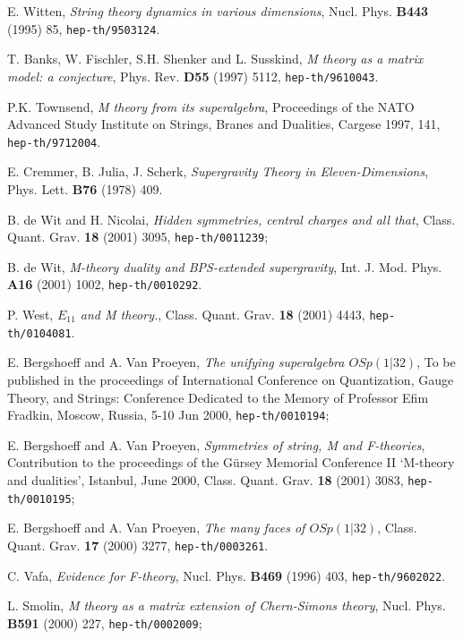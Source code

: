 \documentclass[a4paper,11pt]{article}
\begin{document}
\begin{thebibliography}{99}

E. Witten, {\it String theory dynamics in various dimensions},
Nucl. Phys. {\bf B443} (1995) 85, {\tt hep-th/9503124}.

T. Banks, W. Fischler, S.H. Shenker and L. Susskind,
{\it M theory as a matrix model: a conjecture},
Phys. Rev. {\bf D55} (1997) 5112, {\tt hep-th/9610043}.

P.K. Townsend, {\it M theory from its superalgebra},
Proceedings of the NATO Advanced Study Institute on Strings, 
Branes and Dualities, Cargese 1997, 141, {\tt hep-th/9712004}.

E. Cremmer, B. Julia, J. Scherk, {\it Supergravity Theory in Eleven-Dimensions},
Phys. Lett. {\bf B76} (1978) 409.

B. de Wit and H. Nicolai, {\it Hidden symmetries, central charges and all that}, 
Class. Quant. Grav. {\bf 18} (2001) 3095, {\tt hep-th/0011239};

B. de Wit, {\it M-theory duality and BPS-extended supergravity},
Int. J. Mod. Phys. {\bf A16} (2001) 1002, {\tt hep-th/0010292}.

P. West, {\it $E_{11}$ and M theory.}, 
Class. Quant. Grav. {\bf 18} (2001) 4443, {\tt hep-th/0104081}.

E. Bergshoeff and A. Van Proeyen, {\it The unifying superalgebra $OSp(1|32)$},
To be published in the proceedings of International Conference on Quantization, 
Gauge Theory, and Strings: Conference Dedicated to the Memory of Professor Efim Fradkin, 
Moscow, Russia, 5-10 Jun 2000, {\tt hep-th/0010194};

E. Bergshoeff and A. Van Proeyen, {\it Symmetries of string, M and F-theories},
Contribution to the proceedings of the G\"ursey Memorial Conference II `M-theory and dualities', Istanbul, June 2000,
Class. Quant. Grav. {\bf 18} (2001) 3083, {\tt hep-th/0010195};

E. Bergshoeff and A. Van Proeyen, {\it The many faces of $OSp(1|32)$},
Class. Quant. Grav. {\bf 17} (2000) 3277, {\tt hep-th/0003261}.

C. Vafa, {\it Evidence for F-theory}, Nucl. Phys. {\bf B469} (1996) 403,
{\tt hep-th/9602022}.

L. Smolin, {\it {\cal M} theory as a matrix extension of Chern-Simons theory},
Nucl. Phys. {\bf B591} (2000) 227, {\tt hep-th/0002009};


\end{thebibliography}
\end{document}
